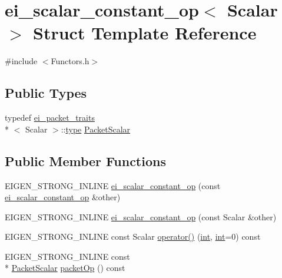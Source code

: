 \hypertarget{structei__scalar__constant__op}{\section{ei\-\_\-scalar\-\_\-constant\-\_\-op$<$ Scalar $>$ Struct Template Reference}
\label{structei__scalar__constant__op}
}


{\ttfamily \#include $<$Functors.\-h$>$}

\subsection*{Public Types}
\begin{DoxyCompactItemize}
\item 
typedef \hyperlink{structei__packet__traits}{ei\-\_\-packet\-\_\-traits}\\*
$<$ Scalar $>$\-::\hyperlink{glext_8h_a7d05960f4f1c1b11f3177dc963a45d86}{type} \hyperlink{structei__scalar__constant__op_a9bd1c6266777bf97c46f4fc0e9f43a4b}{Packet\-Scalar}
\end{DoxyCompactItemize}
\subsection*{Public Member Functions}
\begin{DoxyCompactItemize}
\item 
E\-I\-G\-E\-N\-\_\-\-S\-T\-R\-O\-N\-G\-\_\-\-I\-N\-L\-I\-N\-E \hyperlink{structei__scalar__constant__op_af7a17ba38ff20246bb545550cea07620}{ei\-\_\-scalar\-\_\-constant\-\_\-op} (const \hyperlink{structei__scalar__constant__op}{ei\-\_\-scalar\-\_\-constant\-\_\-op} \&other)
\item 
E\-I\-G\-E\-N\-\_\-\-S\-T\-R\-O\-N\-G\-\_\-\-I\-N\-L\-I\-N\-E \hyperlink{structei__scalar__constant__op_abf3a4c66f8e0a712275562e44554315e}{ei\-\_\-scalar\-\_\-constant\-\_\-op} (const Scalar \&other)
\item 
E\-I\-G\-E\-N\-\_\-\-S\-T\-R\-O\-N\-G\-\_\-\-I\-N\-L\-I\-N\-E const Scalar \hyperlink{structei__scalar__constant__op_a9b091a4b6c205755c12f773a8506c721}{operator()} (\hyperlink{ioapi_8h_a787fa3cf048117ba7123753c1e74fcd6}{int}, \hyperlink{ioapi_8h_a787fa3cf048117ba7123753c1e74fcd6}{int}=0) const 
\item 
E\-I\-G\-E\-N\-\_\-\-S\-T\-R\-O\-N\-G\-\_\-\-I\-N\-L\-I\-N\-E const \\*
\hyperlink{structei__scalar__constant__op_a9bd1c6266777bf97c46f4fc0e9f43a4b}{Packet\-Scalar} \hyperlink{structei__scalar__constant__op_acdf736beabbdf560a941c9a3a85b7d14}{packet\-Op} () const 
\end{DoxyCompactItemize}
